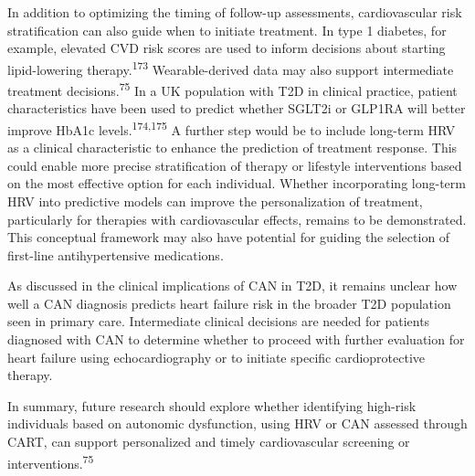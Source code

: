 \documentclass[
  letterpaper,
  headsepline=true,
  open=any]{scrbook}
\begin{document}
In addition to optimizing the timing of follow-up assessments,
cardiovascular risk stratification can also guide when to initiate
treatment. In type 1 diabetes, for example, elevated CVD risk scores are
used to inform decisions about starting lipid-lowering
therapy.\textsuperscript{173} Wearable-derived data may also support
intermediate treatment decisions.\textsuperscript{75} In a UK population
with T2D in clinical practice, patient characteristics have been used to
predict whether SGLT2i or GLP1RA will better improve HbA1c
levels.\textsuperscript{174,175} A further step would be to include
long-term HRV as a clinical characteristic to enhance the prediction of
treatment response. This could enable more precise stratification of
therapy or lifestyle interventions based on the most effective option
for each individual. Whether incorporating long-term HRV into predictive
models can improve the personalization of treatment, particularly for
therapies with cardiovascular effects, remains to be demonstrated. This
conceptual framework may also have potential for guiding the selection
of first-line antihypertensive medications.

As discussed in the clinical implications of CAN in T2D, it remains
unclear how well a CAN diagnosis predicts heart failure risk in the
broader T2D population seen in primary care. Intermediate clinical
decisions are needed for patients diagnosed with CAN to determine
whether to proceed with further evaluation for heart failure using
echocardiography or to initiate specific cardioprotective therapy.

In summary, future research should explore whether identifying high-risk
individuals based on autonomic dysfunction, using HRV or CAN assessed
through CART, can support personalized and timely cardiovascular
screening or interventions.\textsuperscript{75}
\end{document}

